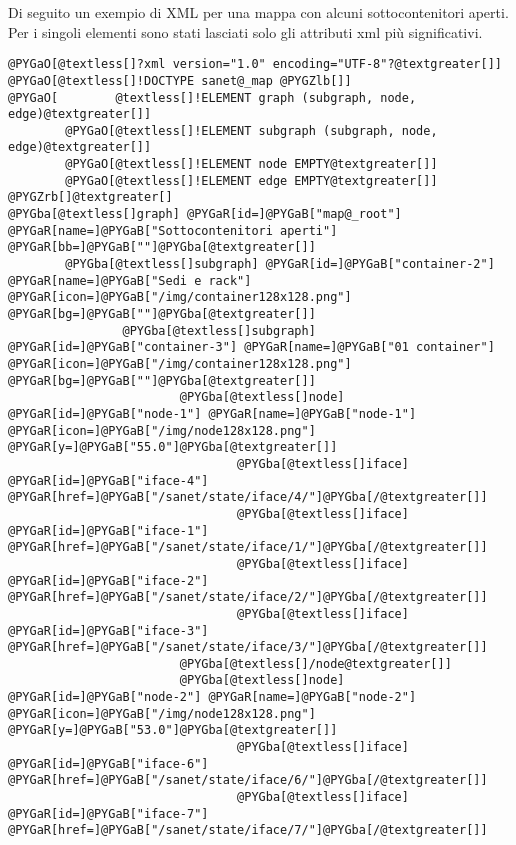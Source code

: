 \documentclass[a4wide,10pt,italian]{manual}
\begin{document}
Di seguito un exempio di XML per una mappa con alcuni sottocontenitori aperti.
Per i singoli elementi sono stati lasciati solo gli attributi xml più significativi.

\begin{Verbatim}[commandchars=@\[\]]
@PYGaO[@textless[]?xml version="1.0" encoding="UTF-8"?@textgreater[]]
@PYGaO[@textless[]!DOCTYPE sanet@_map @PYGZlb[]]
@PYGaO[        @textless[]!ELEMENT graph (subgraph, node, edge)@textgreater[]]
        @PYGaO[@textless[]!ELEMENT subgraph (subgraph, node, edge)@textgreater[]]
        @PYGaO[@textless[]!ELEMENT node EMPTY@textgreater[]]
        @PYGaO[@textless[]!ELEMENT edge EMPTY@textgreater[]]
@PYGZrb[]@textgreater[]
@PYGba[@textless[]graph] @PYGaR[id=]@PYGaB["map@_root"] @PYGaR[name=]@PYGaB["Sottocontenitori aperti"] @PYGaR[bb=]@PYGaB[""]@PYGba[@textgreater[]]
        @PYGba[@textless[]subgraph] @PYGaR[id=]@PYGaB["container-2"] @PYGaR[name=]@PYGaB["Sedi e rack"] @PYGaR[icon=]@PYGaB["/img/container128x128.png"] @PYGaR[bg=]@PYGaB[""]@PYGba[@textgreater[]]
                @PYGba[@textless[]subgraph] @PYGaR[id=]@PYGaB["container-3"] @PYGaR[name=]@PYGaB["01 container"] @PYGaR[icon=]@PYGaB["/img/container128x128.png"] @PYGaR[bg=]@PYGaB[""]@PYGba[@textgreater[]]
                        @PYGba[@textless[]node] @PYGaR[id=]@PYGaB["node-1"] @PYGaR[name=]@PYGaB["node-1"] @PYGaR[icon=]@PYGaB["/img/node128x128.png"] @PYGaR[y=]@PYGaB["55.0"]@PYGba[@textgreater[]]
                                @PYGba[@textless[]iface] @PYGaR[id=]@PYGaB["iface-4"] @PYGaR[href=]@PYGaB["/sanet/state/iface/4/"]@PYGba[/@textgreater[]]
                                @PYGba[@textless[]iface] @PYGaR[id=]@PYGaB["iface-1"] @PYGaR[href=]@PYGaB["/sanet/state/iface/1/"]@PYGba[/@textgreater[]]
                                @PYGba[@textless[]iface] @PYGaR[id=]@PYGaB["iface-2"] @PYGaR[href=]@PYGaB["/sanet/state/iface/2/"]@PYGba[/@textgreater[]]
                                @PYGba[@textless[]iface] @PYGaR[id=]@PYGaB["iface-3"] @PYGaR[href=]@PYGaB["/sanet/state/iface/3/"]@PYGba[/@textgreater[]]
                        @PYGba[@textless[]/node@textgreater[]]
                        @PYGba[@textless[]node] @PYGaR[id=]@PYGaB["node-2"] @PYGaR[name=]@PYGaB["node-2"] @PYGaR[icon=]@PYGaB["/img/node128x128.png"] @PYGaR[y=]@PYGaB["53.0"]@PYGba[@textgreater[]]
                                @PYGba[@textless[]iface] @PYGaR[id=]@PYGaB["iface-6"] @PYGaR[href=]@PYGaB["/sanet/state/iface/6/"]@PYGba[/@textgreater[]]
                                @PYGba[@textless[]iface] @PYGaR[id=]@PYGaB["iface-7"] @PYGaR[href=]@PYGaB["/sanet/state/iface/7/"]@PYGba[/@textgreater[]]

\end{Verbatim}
\end{document}
